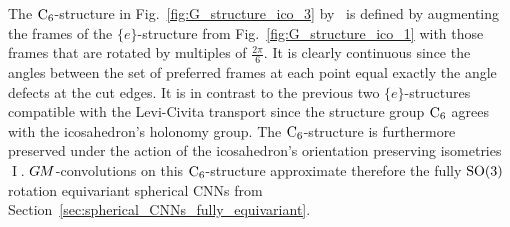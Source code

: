 The $\operatorname{C}_{6}$-structure in Fig.~\ref{fig:G_structure_ico_3} by~\citet{gaugeIco2019} is defined by augmenting the frames of the $\{e\}$-structure from Fig.~\ref{fig:G_structure_ico_1} with those frames that are rotated by multiples of $\frac{2\pi}{6}$.
It is clearly continuous since the angles between the set of preferred frames at each point equal exactly the angle defects at the cut edges.
It is in contrast to the previous two $\{e\}$-structures compatible with the Levi-Civita transport since the structure group $\operatorname{C}_{6}$ agrees with the icosahedron's holonomy group.
The $\operatorname{C}_{6}$-structure is furthermore preserved under the action of the icosahedron's orientation preserving isometries $\operatorname{I}$.
$G\mkern-1.4muM$-convolutions on this $\operatorname{C}_{6}$-structure approximate therefore the fully $\operatorname{SO}(3)$ rotation equivariant spherical CNNs from Section~\ref{sec:spherical_CNNs_fully_equivariant}.

